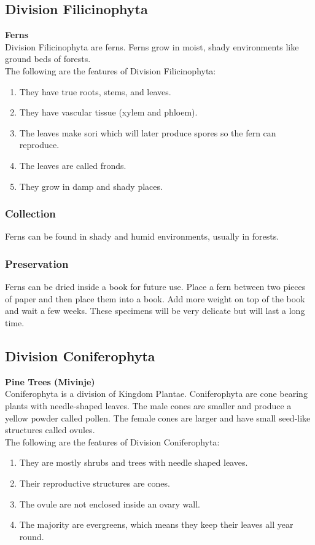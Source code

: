 \subsection{Division Filicinophyta}
\textbf{Ferns}\\
Division Filicinophyta are ferns. Ferns grow in moist, shady environments like ground beds of forests. \\
The following are the features of Division Filicinophyta:
\begin{enumerate}
\item{They have true roots, stems, and leaves.}
\item{They have vascular tissue (xylem and phloem).}
\item{The leaves make sori which will later produce spores so the fern can reproduce.}
\item{The leaves are called fronds.}
\item{They grow in damp and shady places.}
\end{enumerate}

\subsubsection{Collection}
Ferns can be found in shady and humid environments, usually in forests. 

\subsubsection*{Preservation} 
Ferns can be dried inside a book for future use. Place a fern between two pieces of paper and then place them into a book. Add more weight on top of the book and wait a few weeks. These specimens will be very delicate but will last a long time.

\subsection{Division Coniferophyta}
\textbf{Pine Trees (Mivinje)}\\
 Coniferophyta is a division of Kingdom Plantae. Coniferophyta are cone bearing plants with needle-shaped leaves. The male cones are smaller and produce a yellow powder called pollen. The female cones are larger and have small seed-like structures called ovules.\\
The following are the features of Division Coniferophyta:
\begin{enumerate}
\item{They are mostly shrubs and trees with needle shaped leaves.}
\item{Their reproductive structures are cones.}
\item{The ovule are not enclosed inside an ovary wall.}
\item{The majority are evergreens, which means they keep their leaves all year round.}
\end{enumerate}

